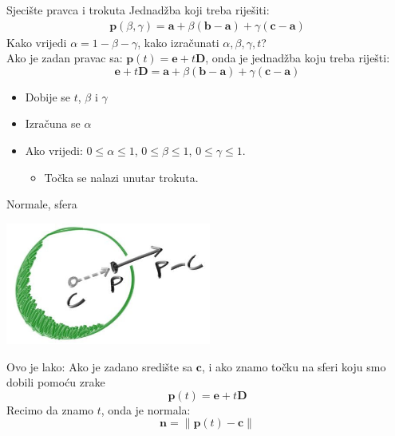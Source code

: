 \documentclass[9pt]{beamer}
\begin{document}
\begin{frame}{Sjecište pravca i trokuta}
	Jednadžba koji treba riješiti:
	\begin{align*}
	\textbf{p}(\beta, \gamma) = \textbf{a} + \beta(\textbf{b}-\textbf{a}) + \gamma(\textbf{c}-\textbf{a})
	\end{align*}
	Kako vrijedi $\alpha = 1- \beta - \gamma$, kako izračunati $\alpha, \beta, \gamma, t$? \\
	Ako je zadan pravac sa: $\textbf{p}(t) = \textbf{e}+t\textbf{D}$, onda je jednadžba koju treba riješti:
	$$\textbf{e}+t\textbf{D} = \textbf{a} + \beta(\textbf{b}-\textbf{a}) + \gamma(\textbf{c}-\textbf{a})$$
	\begin{itemize}
		\item Dobije se $t$, $\beta$ i $\gamma$
		\item Izračuna se $\alpha$
		\item Ako vrijedi: $0 \leq \alpha \leq 1$, $0 \leq \beta \leq 1$, $0 \leq \gamma \leq 1$.
		\begin{itemize}
			\item Točka se nalazi unutar trokuta.
		\end{itemize}
	\end{itemize}
\end{frame}

\begin{frame}{Normale, sfera}
	\begin{center}
		\includegraphics[height=4cm]{./slike/fig-1.05-sphere-normal.jpg}
	\end{center}
Ovo je lako: Ako je zadano središte sa $\mathbf{c}$, i ako znamo točku na sferi koju smo dobili pomoću zrake 
$$\mathbf{p}(t) = \mathbf{e}+t\mathbf{D}$$
Recimo da znamo $t$, onda je normala: 
$$ \mathbf{n} = \lVert \mathbf{p}(t) - \mathbf{c}\rVert$$
\end{frame}
\end{document}

